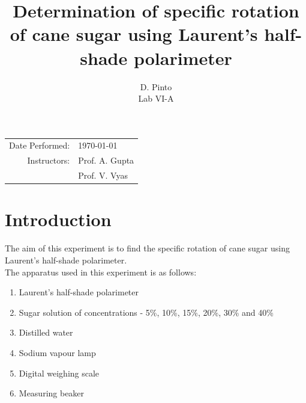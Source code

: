 \documentclass{dkpinto-report}
\title{\bfseries Determination of specific rotation of cane sugar using Laurent's half-shade polarimeter} %
\author{D. Pinto \\ Lab VI-A}        %
\date{\vspace{-5ex}}                 %
\begin{document}
\begin{titlepage}
\maketitle 

\begin{center}           %
\begin{tabular}{r l}     %
Date Performed: & \today \\ 
Instructors: & Prof. A. Gupta \\  
			 & Prof. V. Vyas
\end{tabular}
\end{center}


\tableofcontents  %
\thispagestyle{empty}  %

\end{titlepage}



\section{Introduction} %
The aim of this experiment is to find the specific rotation of cane sugar using Laurent's half-shade polarimeter.\\
The apparatus used in this experiment is as follows:

\begin{enumerate}  %
\itemsep0em  %
\item Laurent's half-shade polarimeter
\item Sugar solution of concentrations - 5\%, 10\%, 15\%, 20\%, 30\% and 40\%  %
\item Distilled water
\item Sodium vapour lamp
\item Digital weighing scale
\item Measuring beaker   
\end{enumerate}



\end{document}

